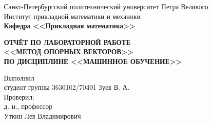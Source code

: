 \documentclass[main.tex]{subfiles}
\begin{document}
\begin{titlepage}
\begin{center}
	\begin{large}
		Санкт-Петербургский политехнический университет Петра Великого\\
		Институт прикладной математики и механики\\
		\textbf{Кафедра <<Прикладная математика>>}\\
	\end{large}
	\vfill
	\Large{\textbf{ОТЧЁТ ПО ЛАБОРАТОРНОЙ РАБОТЕ\\
	<<МЕТОД ОПОРНЫХ ВЕКТОРОВ>>\\
	ПО ДИСЦИПЛИНЕ <<МАШИННОЕ ОБУЧЕНИЕ>>}}
\end{center}
\vfill
\flushleft
Выполнил\\
студент группы 3630102/70401
\flushright
Зуев В. А.\\
\flushleft
Проверил:\\
д. н., профессор\\
\flushright
Уткин Лев Владимирович\\
\vfill
{}
\end{titlepage}
\end{document}
